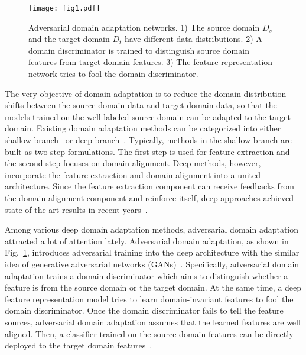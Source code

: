 \documentclass[sigconf]{acmart}
\begin{document}
\begin{figure}[t]
\begin{center}
\texttt{[image: fig1.pdf]}
\end{center}
\vspace{-10pt}
\caption{\small Adversarial domain adaptation networks. 1) The source domain $D_s$ and the target domain $D_t$ have different data distributions. 2) A domain discriminator is trained to distinguish source domain features from target domain features. 3) The feature representation network tries to fool the domain discriminator.}
\label{fig:intro}
\vspace{-20pt} 
\end{figure} 

The very objective of domain adaptation is to reduce the domain distribution shifts between the source domain data and target domain data, so that the models trained on the well labeled source domain can be adapted to the target domain. Existing domain adaptation methods can be categorized into either shallow branch~\cite{pan2011domain,gong2012geodesic,li2018transfer,saenko2010adapting,li2019locality} or deep branch~\cite{ganin2016domain,long2018conditional,hoffman2018cycada,bousmalis2017unsupervised}. Typically, methods in the shallow branch are built as two-step formulations. The first step is used for feature extraction and the second step focuses on domain alignment. Deep methods, however, incorporate the feature extraction and domain alignment into a united architecture. Since the feature extraction component can receive feedbacks from the domain alignment component and reinforce itself, deep approaches achieved state-of-the-art results in recent years~\cite{long2018conditional,hoffman2018cycada}.


Among various deep domain adaptation methods, adversarial domain adaptation~\cite{ganin2016domain,tzeng2017adversarial,hong2018conditional,long2018conditional} attracted a lot of attention lately. Adversarial domain adaptation, as shown in Fig.~\ref{fig:intro}, introduces adversarial training into the deep architecture with the similar idea of generative adversarial networks (GANs)~\cite{goodfellow2014generative,mirza2014conditional}. Specifically, adversarial domain adaptation trains a domain discriminator which aims to distinguish whether a feature is from the source domain or the target domain. At the same time, a deep feature representation model tries to learn domain-invariant features to fool the domain discriminator. Once the domain discriminator fails to tell the feature sources, adversarial domain adaptation assumes that the learned features are well aligned. Then, a classifier trained on the source domain features can be directly deployed to the target domain features~\cite{tzeng2017adversarial,sankaranarayanan2018generate}.
\end{document}
